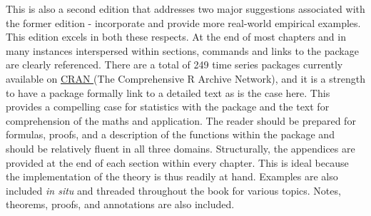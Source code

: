 \documentclass[bookreview]{jss}
\begin{document}
This is also a second edition that addresses two major suggestions associated with the former edition - incorporate  and provide more real-world empirical examples. This edition excels in both these respects. At the end of most chapters and in many instances interspersed within sections,  commands and links to the package  are clearly referenced. There are a total of 249 time series packages currently available on \href{https://cran.r-project.org/web/views/TimeSeries.html}{CRAN }(The Comprehensive R Archive Network), and it is a strength to have a package formally link to a detailed text as is the case here. This provides a compelling case for statistics with the  package and the text for comprehension of the maths and application. The reader should be prepared for formulas, proofs, and a description of the functions within the  package  and should be relatively fluent in all three domains. Structurally, the appendices are provided at the end of each section within every chapter. This is ideal because the implementation of the theory is thus readily at hand. Examples are also included \textit{in situ} and threaded throughout the book for various topics. Notes, theorems, proofs, and annotations are also included.  \newline
\end{document}
